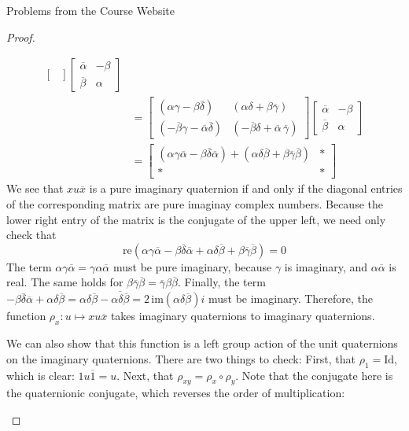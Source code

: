 \documentclass[12pt]{article}
\theoremstyle{definition}
\newenvironment{problem}[2][Problem]{\begin{trivlist}
\item[\hskip \labelsep {\bfseries #1}\hskip \labelsep {\bfseries #2.}]}{\end{trivlist}}
\begin{document}
\begin{section}{Problems from the Course Website}
\begin{problem}{3}
\begin{proof}
\begin{enumerate}[label=(\alph*)]
\begin{align*}
\begin{bmatrix}
					\end{bmatrix}\begin{bmatrix}
						\overline \alpha & -\beta \\
						 \overline \beta & \alpha
					\end{bmatrix}\\
					&= \begin{bmatrix}
					(\alpha \gamma - \beta \overline \delta) & (\alpha \delta + \beta \overline \gamma)\\
					(-\overline \beta \gamma - \overline \alpha  \overline {\delta}) & (-\overline \beta \delta + \overline\alpha \, \overline{ \gamma})
					\end{bmatrix}\begin{bmatrix}
						\overline \alpha & -\beta \\
						 \overline \beta & \alpha
					\end{bmatrix}\\
					&= \begin{bmatrix}
					(\alpha \gamma \overline \alpha - \beta \overline \delta \overline { \alpha}) + (\alpha \delta \overline \beta + \beta \overline \gamma \overline{  \beta}) & * \\
					* & * 
					\end{bmatrix}
					\end{align*}
					We see that $xu\overline x$ is a pure imaginary quaternion if and only if the diagonal entries of the corresponding matrix are pure imaginay complex numbers. Because the lower right entry of the matrix is the conjugate of the upper left, we need only check that
					\[
                        \text{re}(\alpha \gamma \overline \alpha - \beta \overline \delta \overline{ \alpha} + \alpha \delta \overline \beta + \beta \overline \gamma \overline {  \beta}) = 0					
					\]
					The term $\alpha \gamma \overline \alpha = \gamma \alpha \overline \alpha$ must be pure imaginary, because $\gamma$ is imaginary, and $\alpha \overline \alpha$ is real. The same holds for $\beta \overline \gamma \overline{ \beta} = \overline \gamma \beta \overline \beta$. Finally, the term $- \beta \overline \delta \overline{ \alpha} + \alpha \delta \overline \beta = \alpha \delta \overline \beta - \overline{ \alpha  \delta \overline \beta} = 2 \,\text{im}(\alpha \delta \overline \beta)i$ must be imaginary. Therefore, the function $\rho_x : u \mapsto xu\overline x$ takes imaginary quaternions to imaginary quaternions.
					\par We can also show that this function is a left group action of the unit quaternions on the imaginary quaternions. There are two things to check: First, that $\rho_1 = \text{Id}$, which is clear: $1 u \overline 1 = u$. Next, that $\rho_{xy} = \rho_x \circ \rho_y$. Note that the conjugate here is the quaternionic conjugate, which reverses the order of multiplication:

\end{enumerate}
\end{proof}
\end{problem}
\end{section}
\end{document}
